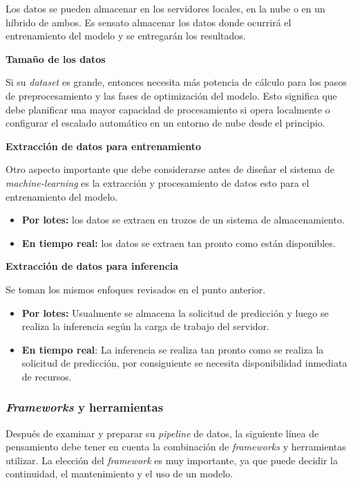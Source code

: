 \documentclass[a4paper,12pt]{article}
\begin{document}
		Los datos se pueden almacenar en los servidores locales, en la nube o en un híbrido de ambos. Es sensato almacenar los datos donde ocurrirá el entrenamiento del modelo y se entregarán los resultados.
		
		\textbf{Tamaño de los datos}
		
		Si su \textit{dataset} es grande, entonces necesita más potencia de cálculo para los pasos de preprocesamiento y las fases de optimización del modelo. Esto significa que debe planificar una mayor capacidad de procesamiento si opera localmente o configurar el escalado automático en un entorno de nube desde el principio.
		
		\textbf{Extracción de datos para entrenamiento}
		
		Otro aspecto importante que debe considerarse antes de diseñar el sistema de \textit{machine-learning} es la extracción y procesamiento de datos esto para el entrenamiento del modelo.
		\begin{itemize}[noitemsep, topsep=2pt]
			\item \textbf{Por lotes:} los datos se extraen en trozos de un sistema de almacenamiento. 
			\item \textbf{En tiempo real:} los datos se extraen tan pronto como están disponibles. 
		\end{itemize}
		
		\textbf{Extracción de datos para inferencia}
		
		Se toman los mismos enfoques revisados en el punto anterior.
		\begin{itemize}[noitemsep, topsep=2pt]
			\item \textbf{Por lotes:} Usualmente se almacena la solicitud de predicción y luego se realiza la inferencia según la carga de trabajo del servidor.
			\item \textbf{En tiempo real}: La inferencia se realiza tan pronto como se realiza la solicitud de predicción, por consiguiente se necesita disponibilidad inmediata de recursos.
		\end{itemize}
		
		\subsubsection{\textit{Frameworks} y herramientas}
		
		Después de examinar y preparar su \textit{pipeline} de datos, la siguiente línea de pensamiento debe tener en cuenta la combinación de \textit{frameworks} y herramientas utilizar. La elección del \textit{framework} es muy importante, ya que puede decidir la continuidad, el mantenimiento y el uso de un modelo.
		
\end{document}
